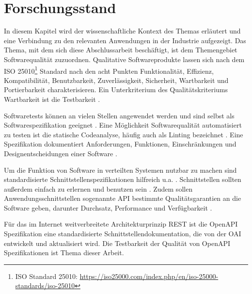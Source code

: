 \section{Forschungsstand} \label{sec:forschungsstand}


In diesem Kapitel wird der wissenschaftliche Kontext des Themas erläutert und eine Verbindung zu den relevanten Anwendungen in der Industrie aufgezeigt.
Das Thema, mit dem sich diese Abschlussarbeit beschäftigt, ist dem Themengebiet Softwarequalität zuzuordnen. Qualitative Softwareprodukte lassen sich nach dem \acf{ISO} 25010\footnote{ISO Standard 25010: \href{https://iso25000.com/index.php/en/iso-25000-standards/iso-25010}{https://iso25000.com/index.php/en/iso-25000-standards/iso-25010}} Standard \parencite{noauthor_isoiec_2023} nach den acht Punkten Funktionalität, Effizienz, Kompatibilität, Benutzbarkeit, Zuverlässigkeit, Sicherheit, Wartbarkeit und Portierbarkeit charakterisieren. Ein Unterkriterium des Qualitätskriteriums Wartbarkeit ist die Testbarkeit \parencite{bergsmann_requirements_2023}. 

Softwaretests können an vielen Stellen angewendet werden und sind selbst als Softwarespezifikation geeignet \parencite{reisig_informatik_2006}. Eine Möglichkeit Softwarequalität automatisiert zu testen ist die statische Codeanalyse, häufig auch als Linting bezeichnet \parencite{tomasdottir_adoption_2018}. Eine Spezifikation dokumentiert Anforderungen, Funktionen, Einschränkungen und Designentscheidungen einer Software \parencite{sommerville_software_2018}. 

Um die Funktion von Software in verteilten Systemen nutzbar zu machen sind standardisierte Schnittstellenspezifikationen hilfreich u.a. \parencite{steen_distributed_2023}. Schnittstellen sollten außerdem \glqq einfach zu erlernen und benutzen sein\grqq{} \parencite{starke_effektive_2024}. Zudem sollen Anwendungsschnittstellen sogenannte \acf{API} bestimmte Qualitätsgarantien an die Software geben, darunter Durchsatz, Performance und Verfügbarkeit \parencite{starke_effektive_2024}. 

Für das im Internet weitverbreitete Architekturprinzip \acf{REST} ist die OpenAPI Spezifikation eine standardisierte Schnittstellendokumentation, die von der \acf{OAI} entwickelt und aktualisiert wird. Die Testbarkeit der Qualität von OpenAPI Spezifikationen ist Thema dieser Arbeit.

